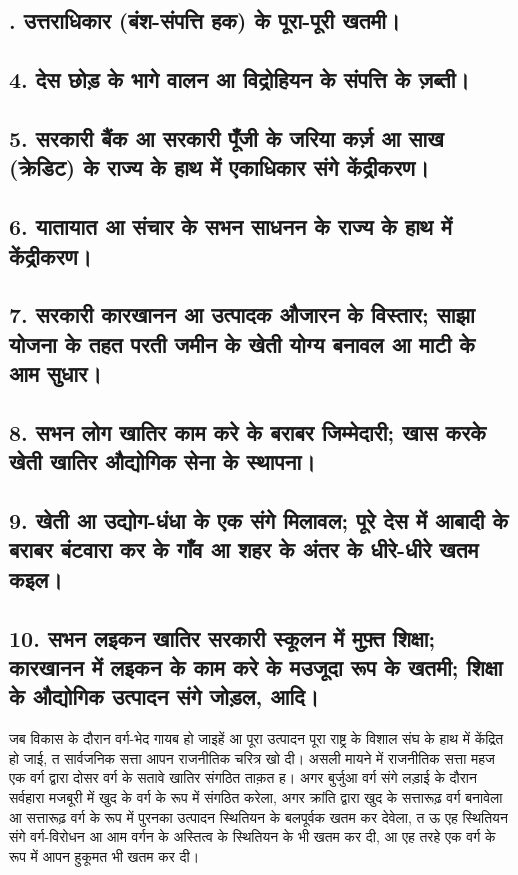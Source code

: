\documentclass[12pt,a4paper,oneside]{book}
\begin{document}
\subsection*{{}. उत्तराधिकार (बंश-संपत्ति हक) के पूरा-पूरी खतमी।}

\subsection*{4. देस छोड़ के भागे वालन आ विद्रोहियन के संपत्ति के ज़ब्ती।}

\subsection*{5. सरकारी बैंक आ सरकारी पूँजी के जरिया कर्ज़ आ साख (क्रेडिट) के राज्य के हाथ में एकाधिकार संगे केंद्रीकरण।}

\subsection*{6. यातायात आ संचार के सभन साधनन के राज्य के हाथ में केंद्रीकरण।}

\subsection*{7. सरकारी कारखानन आ उत्पादक औजारन के विस्तार; साझा योजना के तहत परती जमीन के खेती योग्य बनावल आ माटी के आम सुधार।}

\subsection*{8. सभन लोग खातिर काम करे के बराबर जिम्मेदारी; खास करके खेती खातिर औद्योगिक सेना के स्थापना।}

\subsection*{9. खेती आ उद्योग-धंधा के एक संगे मिलावल; पूरे देस में आबादी के बराबर बंटवारा कर के गाँव आ शहर के अंतर के धीरे-धीरे खतम कइल।}

\subsection*{10. सभन लइकन खातिर सरकारी स्कूलन में मुफ़्त शिक्षा; कारखानन में लइकन के काम करे के मउजूदा रूप के खतमी; शिक्षा के औद्योगिक उत्पादन संगे जोड़ल, आदि।}
जब विकास के दौरान वर्ग-भेद गायब हो जाइहें आ पूरा उत्पादन पूरा राष्ट्र के विशाल संघ के हाथ में केंद्रित हो जाई, त सार्वजनिक सत्ता आपन राजनीतिक चरित्र खो दी। असली मायने में राजनीतिक सत्ता महज एक वर्ग द्वारा दोसर वर्ग के सतावे खातिर संगठित ताक़त ह। अगर बुर्जुआ वर्ग संगे लड़ाई के दौरान सर्वहारा मजबूरी में खुद के वर्ग के रूप में संगठित करेला, अगर क्रांति द्वारा खुद के सत्तारूढ़ वर्ग बनावेला आ सत्तारूढ़ वर्ग के रूप में पुरनका उत्पादन स्थितियन के बलपूर्वक खतम कर देवेला, त ऊ एह स्थितियन संगे वर्ग-विरोधन आ आम वर्गन के अस्तित्व के स्थितियन के भी खतम कर दी, आ एह तरहे एक वर्ग के रूप में आपन हुकूमत भी खतम कर दी।
\end{document}

